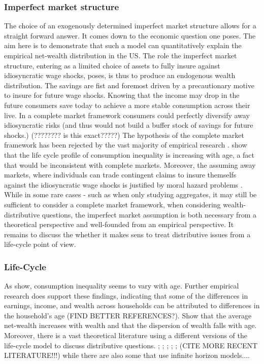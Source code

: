 \documentclass[a4paper,12pt]{article}
\begin{document}
\subsubsection{Imperfect market structure}
The choice of an exogenously determined imperfect market structure allows for a straight forward answer. It comes down to the economic question one poses. The aim here is to demonstrate that such a model can quantitatively explain the empirical net-wealth distribution in the US. The role the imperfect market structure, entering as a limited choice of assets to fully insure against idiosyncratic wage shocks, poses, is thus to produce an endogenous wealth distribution. The savings are fist and foremost driven by a precautionary motive to insure for future wage shocks. Knowing that the income may drop in the future consumers save today to achieve a more stable consumption across their live. In a complete market framework consumers could perfectly diversify away idiosyncratic risks \citep{a&w2010}  (and thus would not build a buffer stock of savings for future shocks.) (???????? is this exact?????)
The hypothesis of the complete market framework has been rejected by the vast majority of empirical research \citep{a&w2010}. \cite{deaton1994} show that the life cycle profile of consumption inequality is increasing with age, a fact that would be inconsistent with complete markets. Moreover, the assuming away markets, where individuals can trade contingent claims to insure themselfs against the idiosyncratic wage shocks is justified by moral hazard problems \citep{FV&K2011}. While in some rare cases - such as when only studying aggregates, it may still be sufficient to consider a complete market framework, when considering wealth-distributive questions, the imperfect market assumption is both necessary from a theoretical perspective and well-founded from an empirical perspective. It remains to discuss the whether it makes sens to treat distributive issues from a life-cycle point of view.

\subsubsection{Life-Cycle}

As \cite{deaton1994} show, consumption inequality seems to vary with age. Further empirical research does support these findings, indicating that some of the differences in earnings, income, and wealth across households can be attributed to differences in the household's age \cite{rios2016} (FIND BETTER REFERENCES?). \cite{hintermaier2011} Show that the average net-wealth increases with wealth and that the dispersion of wealth falls with age. 
Moreover, there is a vast theoretical literature using a different versions of the life-cycle model to discuss distributive questions.  \cite{Gourinchas&Parker2002}; \cite{cagetti2003}; \cite{castaneda2003}; \cite{yang2009}; \cite{kaplan2010};\cite{hintermaier2011} (CITE MORE RECENT LITERATURE!!!)
while there are also some that use infinite horizon models....
\end{document}
